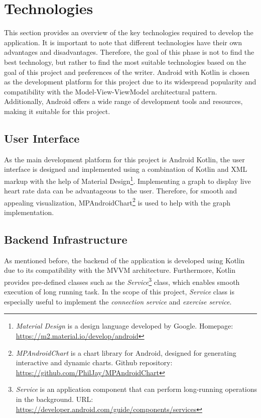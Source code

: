 \section{Technologies}
\label{chap:tech}
This section provides an overview of the key technologies required to develop the application. It is important to note that different technologies have their own advantages and disadvantages. Therefore, the goal of this phase is not to find the best technology, but rather to find the most suitable technologies based on the goal of this project and preferences of the writer. 
Android with Kotlin is chosen as the development platform for this project due to its widespread popularity and compatibility with the Model-View-ViewModel architectural pattern. Additionally, Android offers a wide range of development tools and resources, making it suitable for this project.

\subsection{User Interface}
As the main development platform for this project is Android Kotlin, the user interface is designed and implemented using a combination of Kotlin and XML markup with the help of Material Design\footnote{\emph{Material Design} is a design language developed by Google. Homepage: \url{https://m2.material.io/develop/android}}.
Implementing a graph to display live heart rate data can be advantageous to the user. Therefore, for smooth and appealing visualization, MPAndroidChart\footnote{\emph{MPAndroidChart} is a chart library for Android, designed for generating interactive and dynamic charts. Github repository: \url{https://github.com/PhilJay/MPAndroidChart}} is used to help with the graph implementation.
\subsection{Backend Infrastructure}
As mentioned before, the backend of the application is developed using Kotlin due to its compatibility with the MVVM architecture. 
Furthermore, Kotlin provides pre-defined classes such as the \emph{Service}\footnote{\emph{Service} is an application component that can perform long-running operations in the background. URL: \url{https://developer.android.com/guide/components/services}} class, which enables smooth execution of long running task. In the scope of this project, \emph{Service} class is especially useful to implement the \emph{connection service} and \emph{exercise service}.

